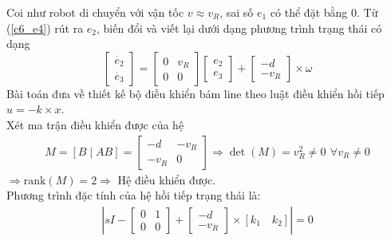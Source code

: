           \hspace*{0.6cm}Coi như robot di chuyển với vận tốc $v \approx v_R$, sai số $e_1$ có thể đặt bằng 0. Từ (\ref{c6_e4}) rút ra $e_2$, biến đổi và viết lại dưới dạng phương trình trạng thái có dạng
          \begin{equation*}
               \begin{bmatrix}
                    \dot{e_2}\\
                    \dot{e_3}
               \end{bmatrix} = 
               \begin{bmatrix}
                    0 & v_R \\
                    0 & 0
               \end{bmatrix}
               \begin{bmatrix}
                    e_2\\
                    e_3
               \end{bmatrix} + \begin{bmatrix}
                    -d \\ 
                    -v_R 
               \end{bmatrix} \times \omega 
          \end{equation*}
          \hspace*{0.6cm}Bài toán đưa về thiết kế bộ điều khiển bám line theo luật điều khiển hồi tiếp $u = -k \times x$.\\
          \hspace*{0.6cm}Xét ma trận điều khiển được của hệ
          \begin{align}
               M = [B \mid AB] = \begin{bmatrix}
               -d & -v_R \\
               -v_R & 0
          \end{bmatrix} \Rightarrow \det(M) = v_R^2 \neq 0 \,\ \forall v_R \neq 0
          \end{align}
          \hspace*{0.6cm}$\Rightarrow \text{rank}(M) = 2 \Rightarrow$ Hệ điều khiển được. \\
          \hspace*{0.6cm}Phương trình đặc tính của hệ hồi tiếp trạng thái là:
          \begin{align*}
               \left|sI - \begin{bmatrix} 0 & 1 \\ 0 & 0 \end{bmatrix} + \begin{bmatrix} -d \\ -v_R \end{bmatrix} \times [k_1 \quad k_2]\right| = 0
          \end{align*}
